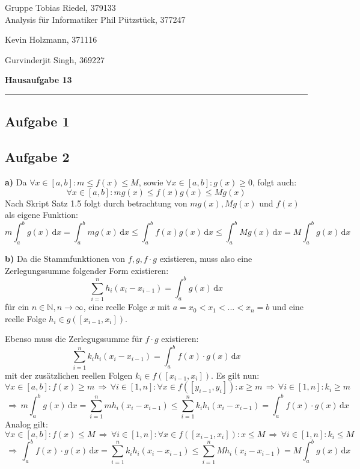 \documentclass[a4paper,graphics,11pt]{article}
\newcommand{\aufgabe}[1]{\subsection*{Aufgabe #1}}
\begin{document}
\noindent Gruppe              \hfill Tobias Riedel, 379133 \\
\noindent Analysis für Informatiker             \hfill Phil Pützstück, 377247 \\
\strut\hfill Kevin Holzmann, 371116\\
\strut\hfill Gurvinderjit Singh, 369227
\begin{center}
	\LARGE{\textbf{Hausaufgabe  13}}
\end{center}
\begin{center}
\rule[0.1ex]{\textwidth}{1pt}
\end{center}



\aufgabe{1}


\aufgabe{2}
\textbf{a)}
Da $\forall x \in [a,b] \colon m \leq f(x) \leq M$, sowie $\forall x \in [a,b]\colon g(x) \geq 0$, folgt auch:
$$
	\forall x \in [a,b] \colon mg(x)\leq f(x)g(x) \leq Mg(x)
$$
Nach Skript Satz 1.5 folgt durch betrachtung von $mg(x), Mg(x)$ und $f(x)$ als eigene Funktion:
$$
	m\int_{a}^{b} g(x)\, \mathrm{d}x
	= \int_{a}^{b} mg(x)\, \mathrm{d}x
	\leq \int_{a}^{b} f(x)g(x)\, \mathrm{d}x
	\leq \int_{a}^{b} Mg(x)\, \mathrm{d}x
	= M\int_{a}^{b} g(x)\, \mathrm{d}x
$$

\textbf{b)}
Da die Stammfunktionen von $f, g, f\cdot g$ existieren, muss also eine Zerlegungssumme folgender Form existieren:
$$
	\sum_{i=1}^{n} h_i(x_i-x_{i-1}) = \int_{a}^{b} g(x)\, \mathrm{d}x
$$
für ein $n \in \mathbb{N}, n \to \infty$, eine reelle Folge $x$ mit $a = x_0 < x_1 < ... < x_n = b$ und eine
reelle Folge $h_i \in g([x_{i-1}, x_i])$.

Ebenso muss die Zerlegugssumme für $f\cdot g$ existieren:
$$
	\sum_{i=1}^{n} k_ih_i(x_i-x_{i-1}) = \int_{a}^{b} f(x)\cdot g(x)\, \mathrm{d}x
$$
mit der zusätzlichen reellen Folgen $k_i \in f([x_{i-1}, x_i])$.
Es gilt nun:
$$
	\forall x \in [a,b]\colon f(x) \geq m \,\Longrightarrow\, \forall i \in [1,n]\colon \forall x \in f([y_{i-1}, y_i])\colon x \geq m \,\Longrightarrow\, \forall i \in [1,n]\colon k_i \geq m
$$$$
	\,\Longrightarrow\, m\int_{a}^{b} g(x)\, \mathrm{d}x
	= \sum_{i=1}^{n} mh_i(x_i-x_{i-1}) 
	\leq \sum_{i=1}^{n} k_ih_i(x_i-x_{i-1})
	= \int_{a}^{b} f(x)\cdot g(x)\, \mathrm{d}x
$$
Analog gilt:
$$
	\forall x \in [a,b]\colon f(x) \leq M \,\Longrightarrow\, \forall i \in [1,n]\colon \forall x \in f([x_{i-1}, x_i])\colon x \leq M \,\Longrightarrow\, \forall i \in [1,n]\colon k_i \leq M
$$$$
	\,\Longrightarrow\, \int_{a}^{b} f(x)\cdot g(x)\, \mathrm{d}x
	= \sum_{i=1}^{n} k_ih_i(x_i-x_{i-1})
	\leq \sum_{i=1}^{n} Mh_i(x_i-x_{i-1}) 
	= M\int_{a}^{b} g(x)\, \mathrm{d}x
$$
\end{document}
